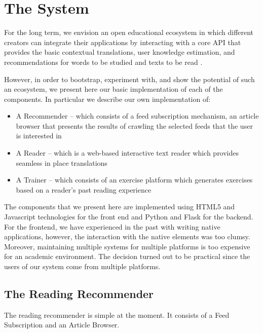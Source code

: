 
\newpage
\section{The System}

For the long term, we envision an open educational ecosystem in which different creators can integrate their applications by interacting with a core API that provides the basic contextual translations, user knowledge estimation, and recommendations for words to be studied and texts to be read \cite{Lungu16}. 

However, in order to bootstrap, experiment with, and show the potential of such an ecosystem, we present here our basic implementation of each of the components. In particular we describe our own implementation of: 

\begin{itemize}

  \item A Recommender -- which consists of a feed subscription mechanism, an article browser that presents the results of crawling the selected feeds that the user is interested in

  \item A Reader -- which is a web-based interactive text reader which provides seamless in place translations
  
  \item A Trainer -- which consists of an exercise platform which generates exercises based on a reader's past reading experience

\end{itemize}

The components that we present here are implemented using HTML5 and Javascript technologies for the front end and Python and Flask for the backend. For the frontend, we have experienced in the past with writing native applications, however, the interaction with the native elements was too clumsy. Moreover, maintaining multiple systems for multiple platforms is too expensive for an academic environment. The decision turned out to be practical since the users of our system come from multiple platforms.


\subsection{The Reading Recommender}
The reading recommender is simple at the moment. It consists of a Feed Subscription and an Article Browser.

